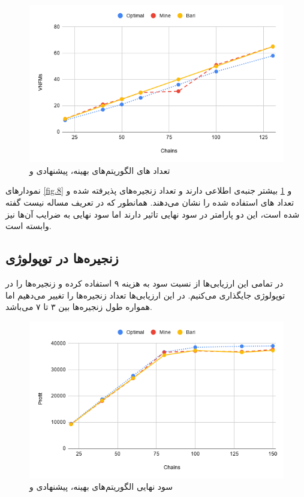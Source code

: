 \begin{figure}[h]
\center\includegraphics[scale=.5]{images/chart-4}
\caption{تعداد های الگوریتم‌های بهینه، پیشنهادی و \cite{Bari2015}}
\label{fig.9}
\end{figure}

نمودارهای \ref{fig.8} و \ref{fig.9}
بیشتر جنبه‌ی اطلاعی دارند و تعداد زنجیره‌های پذیرفته شده و تعداد
های
استفاده شده را نشان می‌دهند.
همانطور که در تعریف مساله نیست گفته شده است، این دو پارامتر در سود نهایی تاثیر دارند
اما سود نهایی به ضرایب آن‌ها نیز وابسته است.

\subsection{زنجیره‌ها در توپولوژی }

در تمامی این ارزیابی‌ها از نسبت سود به هزینه ۹ استفاده کرده و
زنجیره‌ها را در توپولوژی  جایگذاری می‌کنیم.
در این ارزیابی‌ها تعداد زنجیره‌ها را تغییر می‌دهیم اما همواره طول زنجیره‌ها بین ۳ تا ۷ می‌باشد.


\begin{figure}[h]
\center\includegraphics[scale=.5]{images/chart-6}
\caption{سود نهایی الگوریتم‌های بهینه، پیشنهادی و \cite{Bari2015}}
\label{fig.11}
\end{figure}

